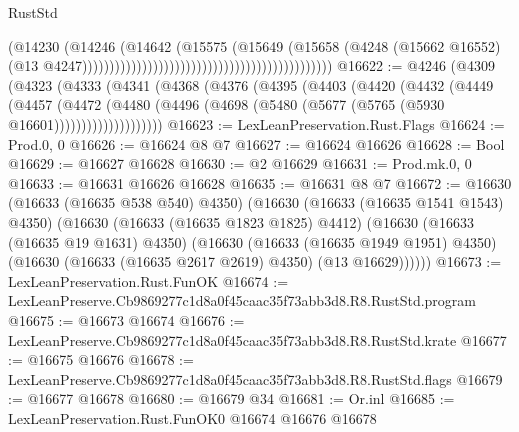 \begin{lexlean}{RustStd}
\begin{coremodule}
                                                                                (@14230
                                                                                  (@14246
                                                                                    (@14642
                                                                                      (@15575
                                                                                        (@15649
                                                                                          (@15658
                                                                                            (@4248
                                                                                              (@15662
                                                                                                @16552)
                                                                                              (@13
                                                                                                @4247))))))))))))))))))))))))))))))))))))))))))))))
@16622 := @4246
    (@4309
      (@4323
        (@4333
          (@4341
            (@4368
              (@4376
                (@4395
                  (@4403
                    (@4420
                      (@4432
                        (@4449
                          (@4457
                            (@4472
                              (@4480
                                (@4496 (@4698 (@5480 (@5677 (@5765 (@5930 @16601))))))))))))))))))))
@16623 := LexLeanPreservation.Rust.Flags
@16624 := Prod.{0, 0}
@16626 := @16624 @8 @7
@16627 := @16624 @16626
@16628 := Bool
@16629 := @16627 @16628
@16630 := @2 @16629
@16631 := Prod.mk.{0, 0}
@16633 := @16631 @16626 @16628
@16635 := @16631 @8 @7
@16672 := @16630
    (@16633 (@16635 @538 @540) @4350)
    (@16630
      (@16633 (@16635 @1541 @1543) @4350)
      (@16630
        (@16633 (@16635 @1823 @1825) @4412)
        (@16630
          (@16633 (@16635 @19 @1631) @4350)
          (@16630
            (@16633 (@16635 @1949 @1951) @4350)
            (@16630 (@16633 (@16635 @2617 @2619) @4350) (@13 @16629))))))
@16673 := LexLeanPreservation.Rust.FunOK
@16674 := LexLeanPreserve.Cb9869277c1d8a0f45caac35f73abb3d8.R8.RustStd.program
@16675 := @16673 @16674
@16676 := LexLeanPreserve.Cb9869277c1d8a0f45caac35f73abb3d8.R8.RustStd.krate
@16677 := @16675 @16676
@16678 := LexLeanPreserve.Cb9869277c1d8a0f45caac35f73abb3d8.R8.RustStd.flags
@16679 := @16677 @16678
@16680 := @16679 @34
@16681 := Or.inl
@16685 := LexLeanPreservation.Rust.FunOK0 @16674 @16676 @16678

\end{coremodule}
\end{lexlean}
